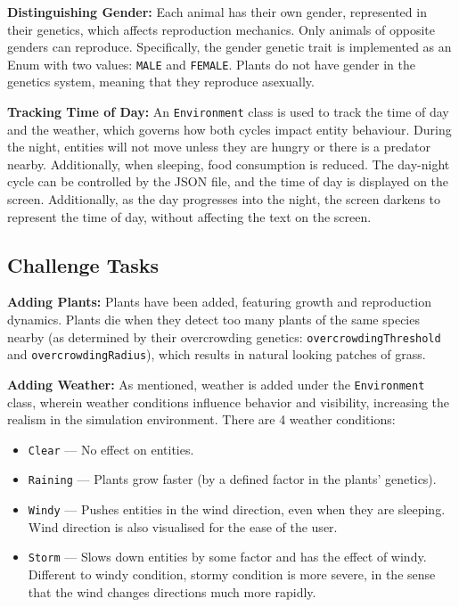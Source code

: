 \documentclass[10pt, a4paper]{scrartcl}
\begin{document}
\begin{multicols}{2}
        \noindent \textbf{Distinguishing Gender:} Each animal has their own gender, represented in their genetics,
        which affects reproduction mechanics. Only animals of opposite genders can reproduce. Specifically, the gender genetic trait
        is implemented as an Enum with two values: \verb|MALE| and \verb|FEMALE|. Plants do not have gender in the genetics system,
        meaning that they reproduce asexually.

        \noindent \textbf{Tracking Time of Day:} An \verb|Environment| class is used to track the time of day and the weather,
        which governs how both cycles impact entity behaviour. During the night, entities will not move unless they are hungry
        or there is a predator nearby. Additionally, when sleeping, food consumption is reduced. The day-night cycle can be controlled
        by the JSON file, and the time of day is displayed on the screen. Additionally, as the day progresses into the night,
        the screen darkens to represent the time of day, without affecting the text on the screen.

        \subsection{Challenge Tasks}

        \noindent \textbf{Adding Plants:} Plants have been added, featuring growth and reproduction dynamics.
        Plants die when they detect too many plants of the same species nearby (as determined by their overcrowding genetics:
        \verb|overcrowdingThreshold| and \verb|overcrowdingRadius|), which results in natural looking patches of grass.

        \noindent \textbf{Adding Weather:} As mentioned, weather is added under the \verb|Environment| class, wherein
        weather conditions influence behavior and visibility, increasing the realism in the simulation environment.
        There are 4 weather conditions:
        \begin{itemize}
            \setlength\itemsep{-0.25em}
            \item \verb|Clear| — No effect on entities.
            \item \verb|Raining| — Plants grow faster (by a defined factor in the plants' genetics).
            \item \verb|Windy| — Pushes entities in the wind direction, even when they are sleeping.
            Wind direction is also visualised for the ease of the user.
            \item \verb|Storm| — Slows down entities by some factor and has the effect of windy. Different to
            windy condition, stormy condition is more severe, in the sense that the wind changes directions much more rapidly.
        \end{itemize}


\end{multicols}
\end{document}
